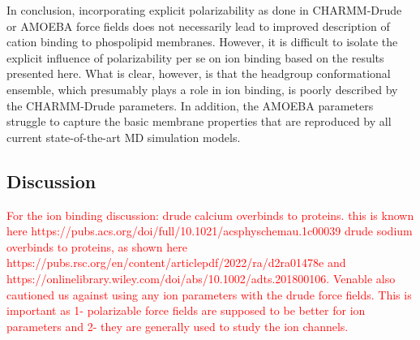 \documentclass[journal=jacsat,manuscript=article,layout=singlecolumn]{achemso}
\begin{document}



In conclusion, incorporating explicit polarizability as done in CHARMM-Drude or AMOEBA force fields does not necessarily lead to improved description of cation binding to phospolipid membranes. However, it is difficult to isolate the explicit influence of polarizability per se on ion binding based on the results presented here. What is clear, however, is that the headgroup conformational ensemble, which presumably plays a role in ion binding, is poorly described by the CHARMM-Drude parameters. In addition, the AMOEBA parameters struggle to capture the basic membrane properties that are reproduced by all current state-of-the-art MD simulation models.


\subsection{Discussion}

\textcolor{red}{For the ion binding discussion: drude calcium overbinds to proteins. this is known here https://pubs.acs.org/doi/full/10.1021/acsphyschemau.1c00039
drude sodium overbinds to proteins, as shown here https://pubs.rsc.org/en/content/articlepdf/2022/ra/d2ra01478e and https://onlinelibrary.wiley.com/doi/abs/10.1002/adts.201800106. Venable also cautioned us against using any ion parameters with the drude force fields. This is important as 1- polarizable force fields are supposed to be better for ion parameters and 2- they are generally used to study the ion channels.}
\end{document}

